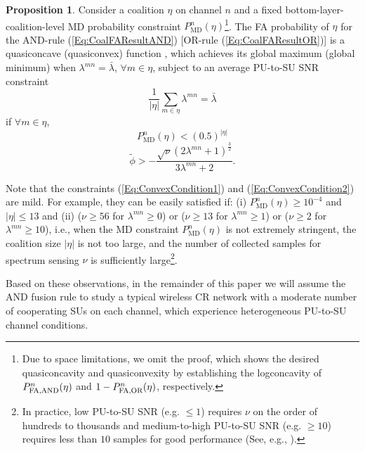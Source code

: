 \documentclass[journal,draftclsnofoot,onecolumn]{IEEEtran}
\theoremstyle{definition}
\newtheorem{Prop}{Proposition}
\begin{document}
\begin{Prop} \label{Prop:Convex} Consider a coalition $\eta$ on channel $n$ and a fixed bottom-layer-coalition-level MD probability constraint $P_{{\mathrm{MD}}}^n(\eta )$\footnote{Due to space limitations, we omit the proof, which shows the desired quasiconcavity and quasiconvexity by establishing the logconcavity of $P_\textnormal{FA,AND}^n(\eta )$ and $1-P_\textnormal{FA,OR}^n(\eta )$, respectively\cite{YLuThesis}.}. The FA probability of $\eta$ for the AND-rule (\ref{Eq:CoalFAResultAND}) [OR-rule (\ref{Eq:CoalFAResultOR})] is a quasiconcave (quasiconvex) function \cite[Section 3.4]{ConvexOpt}, which achieves its global maximum (global minimum) when $\lambda^{mn}=\bar{\lambda}$, $\forall m\in\eta$, subject to an average PU-to-SU SNR constraint
\begin{equation}\label{Eq:SNRConstraint}
\frac{1}{{|\eta |}}\sum\limits_{m \in \eta } {{\lambda ^{mn}}}  = \bar \lambda  
\end{equation}
if $\forall m\in\eta$,
\begin{equation}\label{Eq:ConvexCondition1}
P_{{\mathrm{MD}}}^n(\eta )< {(0.5)^{|\eta |}} 
\end{equation}
\begin{equation}\label{Eq:ConvexCondition2}
\tilde{\phi}>-\frac{\sqrt{\nu}(2\lambda^{mn}+1)^\frac{3}{2}}{3\lambda^{mn}+2}.
\end{equation}
\end{Prop}
Note that the constraints (\ref{Eq:ConvexCondition1}) and (\ref{Eq:ConvexCondition2}) are mild\cite{YLuThesis}. For example, they can be easily satisfied if: (i) $P^n_\mathrm{MD}(\eta)\geq 10^{-4}$ and $|\eta|\leq 13$ and (ii) ($\nu\geq 56$ for $\lambda^{mn}\geq 0$) or ($\nu\geq 13$ for $\lambda^{mn}\geq 1$) or ($\nu\geq 2$ for $\lambda^{mn}\geq 10$), i.e., when the MD constraint  $P^n_\mathrm{MD}(\eta)$ is not extremely stringent, the coalition size $|\eta|$ is not too large, and the number of collected samples for spectrum sensing $\nu$ is sufficiently large{\footnote{In practice, low PU-to-SU SNR (e.g. $\leq 1$) requires $\nu$ on the order of hundreds to thousands and medium-to-high PU-to-SU SNR (e.g. $\geq 10$) requires less than $10$ samples for good performance (See, e.g., \cite{Tradeoff,CoopSense}).}}.

Based on these observations, in the remainder of this paper we will assume the AND fusion rule to study a typical wireless CR network with a moderate number of cooperating SUs on each channel, which experience heterogeneous PU-to-SU channel conditions.
\end{document}
